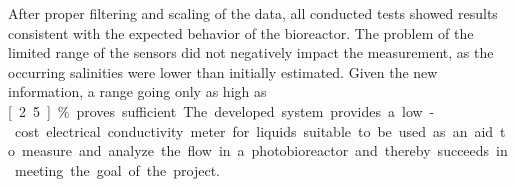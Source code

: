 After proper filtering and scaling of the data, all conducted tests showed results consistent with the expected behavior of the bioreactor. The problem of the limited range of the sensors did not negatively impact the measurement, as the occurring salinities were lower than initially estimated. Given the new information, a range going only as high as \unit[2.5]{\%} proves sufficient. The developed system provides a low-cost electrical conductivity meter for liquids suitable to be used as an aid to measure and analyze the flow in a photobioreactor and thereby succeeds in meeting the goal of the project.